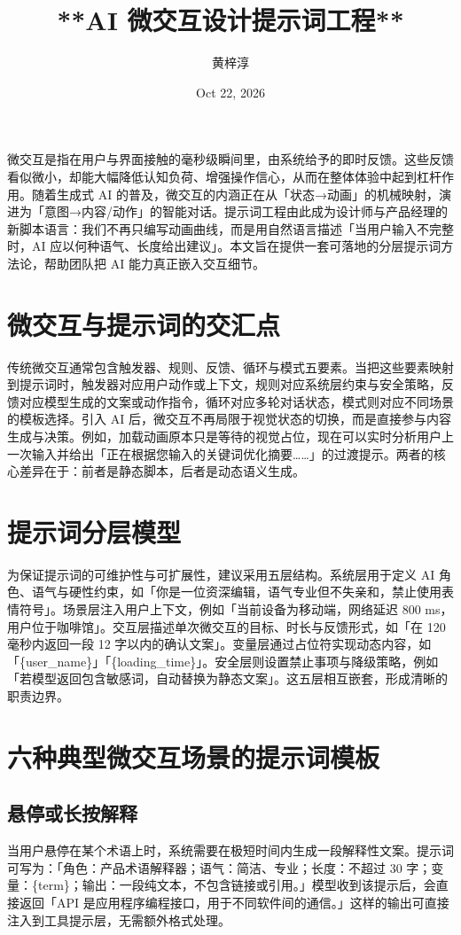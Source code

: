 \title{**AI 微交互设计提示词工程**}
\author{黄梓淳}
\date{Oct 22, 2026}
\maketitle
微交互是指在用户与界面接触的毫秒级瞬间里，由系统给予的即时反馈。这些反馈看似微小，却能大幅降低认知负荷、增强操作信心，从而在整体体验中起到杠杆作用。随着生成式 AI 的普及，微交互的内涵正在从「状态→动画」的机械映射，演进为「意图→内容/动作」的智能对话。提示词工程由此成为设计师与产品经理的新脚本语言：我们不再只编写动画曲线，而是用自然语言描述「当用户输入不完整时，AI 应以何种语气、长度给出建议」。本文旨在提供一套可落地的分层提示词方法论，帮助团队把 AI 能力真正嵌入交互细节。\par
\chapter{微交互与提示词的交汇点}
传统微交互通常包含触发器、规则、反馈、循环与模式五要素。当把这些要素映射到提示词时，触发器对应用户动作或上下文，规则对应系统层约束与安全策略，反馈对应模型生成的文案或动作指令，循环对应多轮对话状态，模式则对应不同场景的模板选择。引入 AI 后，微交互不再局限于视觉状态的切换，而是直接参与内容生成与决策。例如，加载动画原本只是等待的视觉占位，现在可以实时分析用户上一次输入并给出「正在根据您输入的关键词优化摘要……」的过渡提示。两者的核心差异在于：前者是静态脚本，后者是动态语义生成。\par
\chapter{提示词分层模型}
为保证提示词的可维护性与可扩展性，建议采用五层结构。系统层用于定义 AI 角色、语气与硬性约束，如「你是一位资深编辑，语气专业但不失亲和，禁止使用表情符号」。场景层注入用户上下文，例如「当前设备为移动端，网络延迟 800 ms，用户位于咖啡馆」。交互层描述单次微交互的目标、时长与反馈形式，如「在 120 毫秒内返回一段 12 字以内的确认文案」。变量层通过占位符实现动态内容，如「\{{}user\_{}name\}{}」「\{{}loading\_{}time\}{}」。安全层则设置禁止事项与降级策略，例如「若模型返回包含敏感词，自动替换为静态文案」。这五层相互嵌套，形成清晰的职责边界。\par
\chapter{六种典型微交互场景的提示词模板}
\section{悬停或长按解释}
当用户悬停在某个术语上时，系统需要在极短时间内生成一段解释性文案。提示词可写为：「角色：产品术语解释器；语气：简洁、专业；长度：不超过 30 字；变量：\{{}term\}{}；输出：一段纯文本，不包含链接或引用。」模型收到该提示后，会直接返回「API 是应用程序编程接口，用于不同软件间的通信。」这样的输出可直接注入到工具提示层，无需额外格式处理。\par
